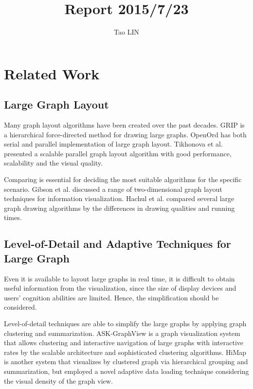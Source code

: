 \documentclass{article}
\title{Report 2015/7/23}
\author{Tao LIN}
\begin{document}
\maketitle

\section{Related Work}

\subsection{Large Graph Layout}

Many graph layout algorithms have been created over the past decades. 
GRIP\cite{gajer2000fast,gajer2001grip} is a hierarchical force-directed method for drawing large graphs.
OpenOrd\cite{martin2011openord} has both serial and parallel implementation of large graph layout.
Tikhonova et al.\cite{tikhonova2008scalable} presented a scalable parallel graph layout algorithm with good performance, scalability and the visual quality.

Comparing is essential for deciding the most suitable algorithms for the specific scenario. Gibson et al.\cite{gibson2013survey} discussed a range of two-dimensional graph layout techniques for information visualization. Hachul et al.\cite{hachul2006experimental} compared several large graph drawing algorithms by the differences in drawing qualities and running times.
 


\subsection{Level-of-Detail and Adaptive Techniques for Large Graph}

Even it is available to layout large graphs in real time, it is difficult to obtain useful information from the visualization, since the size of display devices and users' cognition abilities are limited. Hence, the simplification should be considered.

Level-of-detail techniques are able to simplify the large graphs by applying graph clustering and summarization. ASK-GraphView\cite{abello2006ask} is a graph visualization system that allows clustering and interactive
navigation of large graphs with interactive rates by the scalable architecture and sophisticated clustering algorithms.
HiMap\cite{shi2009himap} is another system that visualizes by clustered graph via hierarchical grouping and summarization, but employed a novel adaptive data loading technique considering the visual density of the graph view.
\end{document}
